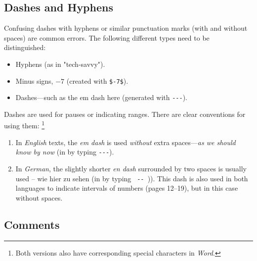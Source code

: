 \subsection{Dashes and Hyphens}
\label{sec:dash}

Confusing dashes with hyphens or similar punctuation marks (with and without
spaces) are common errors. The following different types need to be
distinguished:
%
\begin{itemize}
    \item Hyphens (as in "tech-savvy").
    \item Minus signs, \eg $-7$ (created with \verb!$-7$!).
    \item Dashes---such as the em dash here (generated with \verb!---!).
\end{itemize}
%
\noindent
Dashes are used for pauses or indicating ranges. There are clear conventions
for using them:%
\footnote{Both versions also have corresponding special characters in
\emph{Word}.}
%
\begin{enumerate}
	\item In \emph{English} texts, the \emph{em dash} is used \emph{without}
	extra spaces---\emph{as we should know by now} (in \latex by typing
	{\verb*!---!}).
	\item In \emph{German}, the slightly shorter \emph{en dash} surrounded by
	two spaces is usually used -- wie hier zu sehen (in \latex by typing
	{\verb*! -- !})). This dash is also used in both languages to indicate
	intervals of numbers (pages 12--19), but in this case without spaces.
\end{enumerate}

\subsection{Comments}
\label{sec:comments}

